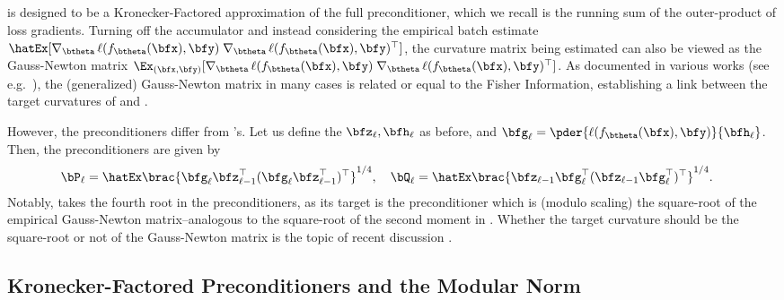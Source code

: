 \subsection{\Shampoo}

\Shampoo is designed to be a Kronecker-Factored approximation of the full \AdaGrad preconditioner, which we recall is the running sum of the outer-product of loss gradients. Turning off the \AdaGrad accumulator and instead considering the empirical batch estimate $\hatEx[\nabla_{\btheta}\, \ell(f_{\btheta}(\bfx), \bfy) \;\nabla_{\btheta} \, \ell(f_{\btheta}(\bfx), \bfy)^\top]$, the curvature matrix being estimated can also be viewed as the Gauss-Newton matrix $\Ex_{(\bfx, \bfy)}[\nabla_{\btheta}\, \ell(f_{\btheta}(\bfx), \bfy) \;\nabla_{\btheta}\, \ell(f_{\btheta}(\bfx), \bfy)^\top]$. As documented in various works (see e.g.\ \citet{martens2020new}), the (generalized) Gauss-Newton matrix in many cases is related or equal to the Fisher Information, establishing a link between the target curvatures of \KFAC and \Shampoo.

However, the \Shampoo preconditioners differ from \KFAC's. Let us define the $\bfz_\ell, \bfh_\ell$ as before, and $\bfg_\ell = \pder{\ell(f_{\btheta}(\bfx), \bfy)}{\bfh_\ell}$. Then, the \Shampoo preconditioners are given by
\begin{align*}
    \bP_\ell &= \hatEx\brac{\bfg_\ell \bfz_{\ell-1}^\top (\bfg_\ell \bfz_{\ell-1}^\top)^\top}^{1/4}, \quad \bQ_\ell = \hatEx\brac{\bfz_{\ell-1} \bfg_\ell^\top (\bfz_{\ell-1} \bfg_\ell^\top)^\top}^{1/4}.
\end{align*}
Notably, \Shampoo takes the fourth root in the preconditioners, as its target is the \AdaGrad preconditioner which is (modulo scaling) the square-root of the empirical Gauss-Newton matrix--analogous to the square-root of the second moment in \Adam. Whether the target curvature should be the square-root or not of the Gauss-Newton matrix is the topic of recent discussion \cite{morwani2024new, lin2024can}.

\subsection{Kronecker-Factored Preconditioners and the Modular Norm}\label{sec:layerwise_modular_norms}

